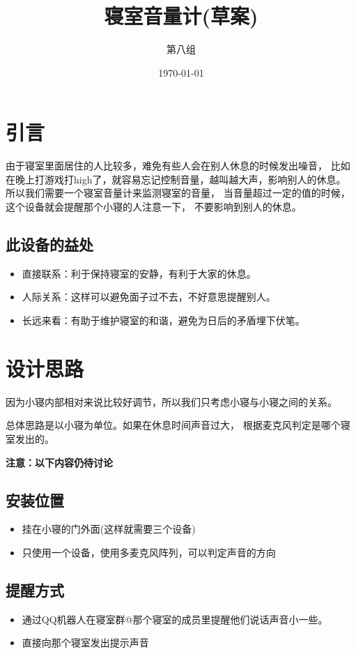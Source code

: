 \documentclass[12pt, a4paper, oneside]{ctexart}
\title{寝室音量计(草案)}
\author{第八组}
\date{\today}
\begin{document}
\maketitle


\section{引言}
由于寝室里面居住的人比较多，难免有些人会在别人休息的时候发出噪音，
比如在晚上打游戏打high了，就容易忘记控制音量，越叫越大声，影响别人的休息。
所以我们需要一个寝室音量计来监测寝室的音量，
当音量超过一定的值的时候，这个设备就会提醒那个小寝的人注意一下，
不要影响到别人的休息。
\subsection*{此设备的益处}
\begin{itemize}
    \item 直接联系：利于保持寝室的安静，有利于大家的休息。
    \item 人际关系：这样可以避免面子过不去，不好意思提醒别人。
    \item 长远来看：有助于维护寝室的和谐，避免为日后的矛盾埋下伏笔。
\end{itemize}

\section{设计思路}
因为小寝内部相对来说比较好调节，所以我们只考虑小寝与小寝之间的关系。

总体思路是以小寝为单位。如果在休息时间声音过大，
根据麦克风判定是哪个寝室发出的。



\textbf{ 注意：以下内容仍待讨论}

\subsection{安装位置}

\begin{itemize}
    \item 挂在小寝的门外面(这样就需要三个设备)
    \item 只使用一个设备，使用多麦克风阵列，可以判定声音的方向
\end{itemize}

\subsection{提醒方式}
\begin{itemize}
    \item 通过QQ机器人在寝室群@那个寝室的成员里提醒他们说话声音小一些。
    \item 直接向那个寝室发出提示声音
\end{itemize}
\end{document}
